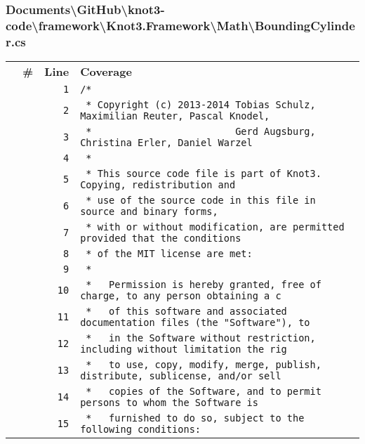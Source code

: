 \documentclass[a4paper,10pt]{article}
\begin{document}
\subsubsection{Documents\textbackslash GitHub\textbackslash knot3-code\textbackslash framework\textbackslash Knot3.Framework\textbackslash Math\textbackslash BoundingCylinder.cs}
\begin{longtable}[l]{lrrl}
\textbf{} & \textbf{\#} & \textbf{Line} & \textbf{Coverage}\\
\cellcolor{gray} &  & \verb~1~ & \verb~/*~\\
\cellcolor{gray} &  & \verb~2~ & \verb~ * Copyright (c) 2013-2014 Tobias Schulz, Maximilian Reuter, Pascal Knodel,~\\
\cellcolor{gray} &  & \verb~3~ & \verb~ *                         Gerd Augsburg, Christina Erler, Daniel Warzel~\\
\cellcolor{gray} &  & \verb~4~ & \verb~ *~\\
\cellcolor{gray} &  & \verb~5~ & \verb~ * This source code file is part of Knot3. Copying, redistribution and~\\
\cellcolor{gray} &  & \verb~6~ & \verb~ * use of the source code in this file in source and binary forms,~\\
\cellcolor{gray} &  & \verb~7~ & \verb~ * with or without modification, are permitted provided that the conditions~\\
\cellcolor{gray} &  & \verb~8~ & \verb~ * of the MIT license are met:~\\
\cellcolor{gray} &  & \verb~9~ & \verb~ *~\\
\cellcolor{gray} &  & \verb~10~ & \verb~ *   Permission is hereby granted, free of charge, to any person obtaining a c~\\
\cellcolor{gray} &  & \verb~11~ & \verb~ *   of this software and associated documentation files (the "Software"), to ~\\
\cellcolor{gray} &  & \verb~12~ & \verb~ *   in the Software without restriction, including without limitation the rig~\\
\cellcolor{gray} &  & \verb~13~ & \verb~ *   to use, copy, modify, merge, publish, distribute, sublicense, and/or sell~\\
\cellcolor{gray} &  & \verb~14~ & \verb~ *   copies of the Software, and to permit persons to whom the Software is~\\
\cellcolor{gray} &  & \verb~15~ & \verb~ *   furnished to do so, subject to the following conditions:~\\

\end{longtable}
\end{document}
